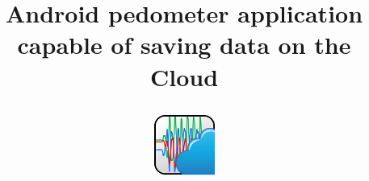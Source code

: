 \documentclass[conference]{IEEEtran}
\begin{document}
\title{Android pedometer application capable of saving data on the Cloud
\begin{figure}[H]
\centering
\includegraphics[width=2cm]{Title.jpg}
\end{figure}
}

\author{

}
\maketitle
\end{document}
